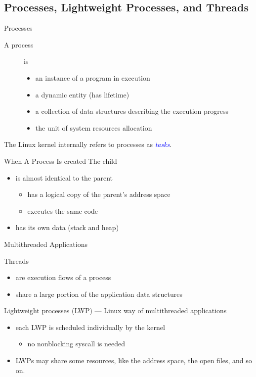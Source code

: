 \subsection{Processes, Lightweight Processes, and Threads}

\begin{frame}{Processes}
  \begin{description}
  \item[A process] is
    \begin{itemize}
    \item an instance of a program in execution
    \item a dynamic entity (has lifetime)
    \item a collection of data structures describing the execution progress
    \item the unit of system resources allocation
    \end{itemize}
  \end{description}
  The Linux kernel internally refers to processes as \textcolor{blue}{\emph{tasks}}.
\end{frame}

\begin{frame}{When A Process Is created}
  The child
  \begin{itemize}
  \item is almost identical to the parent
    \begin{itemize}
    \item has a logical copy of the parent's address space
    \item executes the same code
    \end{itemize}
  \item has its own data (stack and heap)
  \end{itemize}
\end{frame}

\begin{frame}{Multithreaded Applications}
  \begin{block}{Threads}
    \begin{itemize}
    \item are execution flows of a process
    \item share a large portion of the application data structures
    \end{itemize}
  \end{block}
  \begin{block}{Lightweight processes (LWP) --- Linux way of multithreaded
      applications}
    \begin{itemize}
    \item each LWP is scheduled individually by the kernel
      \begin{itemize}
      \item no nonblocking syscall is needed
      \end{itemize}
    \item LWPs may share some resources, like the address space, the
      open files, and so on.
    \end{itemize}
  \end{block}
\end{frame}

